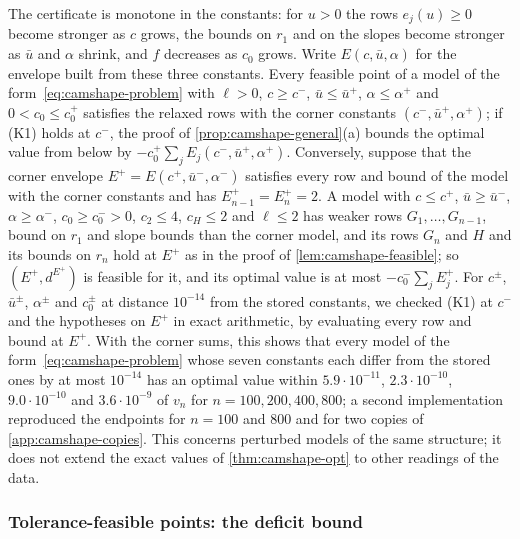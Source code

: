 \begin{remark}\label{rem:camshape-robust}
The certificate is monotone in the constants: for $u > 0$ the rows $e_j(u) \ge 0$ become stronger as $c$ grows, the bounds on $r_1$ and on the slopes become stronger as $\bar u$ and $\alpha$ shrink, and $f$ decreases as $c_0$ grows.
Write $E(c, \bar u, \alpha)$ for the envelope built from these three constants.
Every feasible point of a model of the form~\eqref{eq:camshape-problem} with $\ell > 0$, $c \ge c^-$, $\bar u \le \bar u^+$, $\alpha \le \alpha^+$ and $0 < c_0 \le c_0^+$ satisfies the relaxed rows with the corner constants $(c^-, \bar u^+, \alpha^+)$; if (K1) holds at $c^-$, the proof of \cref{prop:camshape-general}(a) bounds the optimal value from below by $-c_0^+\sum_j E_j(c^-, \bar u^+, \alpha^+)$.
Conversely, suppose that the corner envelope $E^+ = E(c^+, \bar u^-, \alpha^-)$ satisfies every row and bound of the model with the corner constants and has $E^+_{n-1} = E^+_n = 2$.
A model with $c \le c^+$, $\bar u \ge \bar u^-$, $\alpha \ge \alpha^-$, $c_0 \ge c_0^- > 0$, $c_2 \le 4$, $c_H \le 2$ and $\ell \le 2$ has weaker rows $G_1, \dots, G_{n-1}$, bound on $r_1$ and slope bounds than the corner model, and its rows $G_n$ and $H$ and its bounds on $r_n$ hold at $E^+$ as in the proof of \cref{lem:camshape-feasible}; so $(E^+, d^{E^+})$ is feasible for it, and its optimal value is at most $-c_0^-\sum_j E^+_j$.
For $c^\pm$, $\bar u^\pm$, $\alpha^\pm$ and $c_0^\pm$ at distance $10^{-14}$ from the stored constants, we checked (K1) at $c^-$ and the hypotheses on $E^+$ in exact arithmetic, by evaluating every row and bound at $E^+$.
With the corner sums, this shows that every model of the form~\eqref{eq:camshape-problem} whose seven constants each differ from the stored ones by at most $10^{-14}$ has an optimal value within $5.9\cdot10^{-11}$, $2.3\cdot10^{-10}$, $9.0\cdot10^{-10}$ and $3.6\cdot10^{-9}$ of $v_n$ for $n = 100, 200, 400, 800$; a second implementation reproduced the endpoints for $n = 100$ and $800$ and for two copies of \cref{app:camshape-copies}.
This concerns perturbed models of the same structure; it does not extend the exact values of \cref{thm:camshape-opt} to other readings of the data.
\end{remark}

\subsubsection{Tolerance-feasible points: the deficit bound}\label{app:camshape-deficit}

